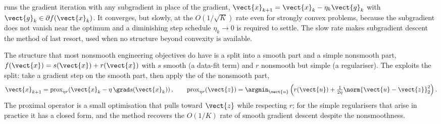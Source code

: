  runs the gradient iteration with any
subgradient in place of the gradient, $\vect{x}_{k+1} =
\vect{x}_{k} - \eta_{k} \vect{g}_{k}$ with $\vect{g}_{k} \in
\partial f(\vect{x}_{k})$. It converges, but slowly, at the
$O(1/\sqrt{K})$ rate even for strongly convex problems, because the
subgradient does not vanish near the optimum and a diminishing step
schedule $\eta_{k} \to 0$ is required to settle. The slow rate
makes subgradient descent the method of last resort, used when no
structure beyond convexity is available.

The structure that most nonsmooth engineering objectives do have is
a split into a smooth part and a simple nonsmooth part, $f(\vect{x})
= s(\vect{x}) + r(\vect{x})$ with $s$ smooth (a data-fit term) and
$r$ nonsmooth but simple (a regulariser). The  exploits the split: take a gradient step on the
smooth part, then apply the  of the
nonsmooth part,
\[
\vect{x}_{k+1} = \operatorname{prox}_{\eta r}\!\left(\vect{x}_{k} -
\eta \, \grad s(\vect{x}_{k})\right),
\qquad
\operatorname{prox}_{\eta r}(\vect{z}) = \argmin_{\vect{u}}
\left( r(\vect{u}) + \tfrac{1}{2 \eta} \norm{\vect{u} -
\vect{z}}_{2}^{2} \right).
\]
The proximal operator is a small optimisation that pulls toward
$\vect{z}$ while respecting $r$; for the simple regularisers that
arise in practice it has a closed form, and the method recovers the
$O(1/K)$ rate of smooth gradient descent despite the nonsmoothness.

